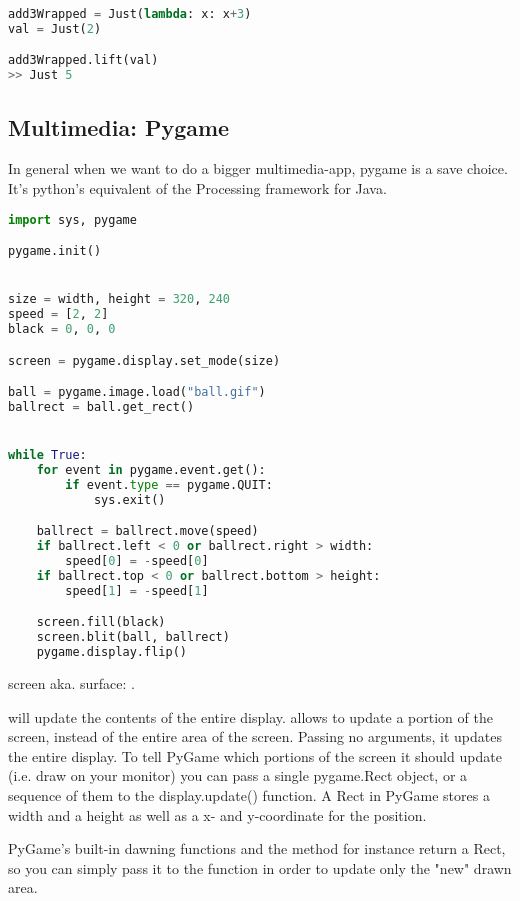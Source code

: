 \begin{lstlisting}[language=python]
add3Wrapped = Just(lambda: x: x+3)
val = Just(2)

add3Wrapped.lift(val)
>> Just 5
\end{lstlisting}


\subsection{Multimedia: Pygame}

In general when we want to do  a bigger multimedia-app, pygame is a save choice. It's python's equivalent of the Processing framework for Java. 

\begin{lstlisting}[language=python]
import sys, pygame

pygame.init()


size = width, height = 320, 240
speed = [2, 2]
black = 0, 0, 0

screen = pygame.display.set_mode(size)

ball = pygame.image.load("ball.gif")
ballrect = ball.get_rect()


while True: 
    for event in pygame.event.get():
        if event.type == pygame.QUIT: 
            sys.exit()

    ballrect = ballrect.move(speed)
    if ballrect.left < 0 or ballrect.right > width:
        speed[0] = -speed[0]
    if ballrect.top < 0 or ballrect.bottom > height:
        speed[1] = -speed[1]

    screen.fill(black)
    screen.blit(ball, ballrect)
    pygame.display.flip()

\end{lstlisting}


screen aka. surface: .

 will update the contents of the entire display.  allows to update a portion of the screen, instead of the entire area of the screen. Passing no arguments, it updates the entire display. 
To tell PyGame which portions of the screen it should update (i.e. draw on your monitor) you can pass a single pygame.Rect object, or a sequence of them to the display.update() function. A Rect in PyGame stores a width and a height as well as a x- and y-coordinate for the position.

PyGame's built-in dawning functions and the  method for instance return a Rect, so you can simply pass it to the  function in order to update only the "new" drawn area.

